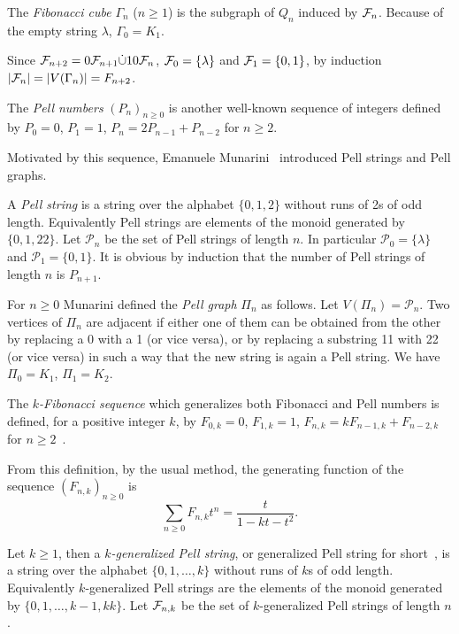 \documentclass[11pt]{article}
\begin{document}
The {\em Fibonacci cube} $\Gamma_n$ ($n\geq 1$) is the subgraph of $Q_n$ induced by ${\cal F}_n$. Because of the empty string $\lambda$, $\Gamma_0 = K_1$. 

Since ${\cal F}_{n+2}=0{\cal F}_{n+1}\dot{\cup} 10{\cal F}_{n}$, ${\cal F}_{0}=\{\lambda\}$ and ${\cal F}_{1}=\{0,1\}$, by induction $|{\cal F}_{n}|=|V(\Gamma_{n})|=F_{n+2}$.  

The {\em Pell numbers} $(P_n)_{n\geq0}$ is another well-known sequence of integers defined by $P_0 = 0$, $P_1=1$, $P_{n} =  2 P_{n-1} + P_{n-2}$ for $n\geq 2$.

Motivated by this sequence, Emanuele Munarini~\cite{M-2019} introduced  Pell strings and  Pell graphs. 

A \emph{Pell string} is a  string over the alphabet $\{0,1,2\}$ without runs of 2s of odd length. Equivalently  Pell strings are elements of the monoid generated by $\{0,1,22\}$. Let ${\mathcal P}_n$ be the set of Pell strings of length $n$. In particular ${\mathcal P}_0=\{\lambda\}$ and ${\mathcal P}_1=\{0,1\}$. It is obvious by induction that the number of Pell strings of length $n$ is  $P_{n+1}$. 

For $n\geq 0$ Munarini defined the \emph{Pell graph} $\Pi_n$ as follows. Let $V(\Pi_n)={\mathcal P}_n$. Two vertices of $\Pi_n$ are adjacent if either one of them can be obtained from the other by replacing a 0 with a 1 (or vice versa), or by replacing a substring 11 with 22 (or vice versa) in such a way that the new string is again a Pell string. We have $\Pi_0=K_1$, $\Pi_1=K_2$. 






The {\em $k$-Fibonacci sequence} which generalizes both Fibonacci and Pell numbers is defined, for a positive integer $k$, by $F_{0,k} = 0$, $F_{1,k}=1$, $F_{n,k} = kF_{n-1,k} + F_{n-2,k}$ for $n\geq 2$~\cite{FP-2007}.

From this definition, by the usual method, the generating function of the sequence $(F_{n,k})_{n\geq 0}$ is 
$$\sum_{n\geq 0}F_{n,k}t^n=\frac{t}{1-kt-t^2}.$$

Let $k\geq1$, then a \emph{$k$-generalized Pell string}, or generalized Pell string for short~\cite{IKT-2023}, is a string over the alphabet $\{0,1,\ldots, k\}$ without runs of $k$s of odd length. Equivalently  $k$-generalized Pell strings are the elements of the monoid generated by $\{0,1,\ldots, k-1,kk \}$. Let ${\cal F}_{n,k}$ be the set of $k$-generalized Pell strings of length $n$ .
\end{document}
